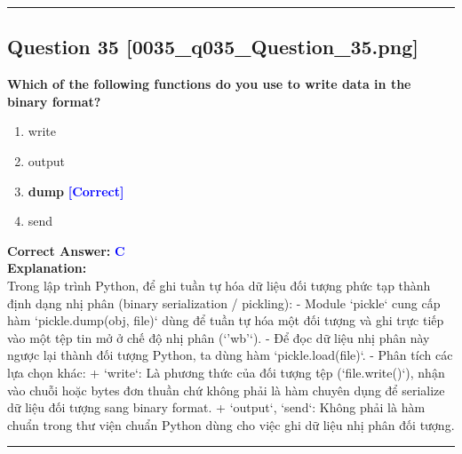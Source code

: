 \documentclass[11pt,a4paper]{article}
\begin{document}
\vspace{0.8cm}
\hrule
\vspace{0.5cm}

\begin{minipage}{\textwidth}
\subsection*{Question 35 \quad \footnotesize{[0035_q035_Question_35.png]}}
\noindent \textbf{Which of the following functions do you use to write data in the binary format?}

\begin{enumerate}[label=\Alph*.]
    \item write
    \item output
    \item \textbf{dump} \hfill \textcolor{blue}{\textbf{[Correct]}}
    \item send
\end{enumerate}

\noindent \textbf{Correct Answer:} \textcolor{blue}{\textbf{C}} \\[4pt]
\noindent \textbf{Explanation:}\\
Trong lập trình Python, để ghi tuần tự hóa dữ liệu đối tượng phức tạp thành định dạng nhị phân (binary serialization / pickling):\newline
- Module `pickle` cung cấp hàm `pickle.dump(obj, file)` dùng để tuần tự hóa một đối tượng và ghi trực tiếp vào một tệp tin mở ở chế độ nhị phân (`'wb'`).\newline
- Để đọc dữ liệu nhị phân này ngược lại thành đối tượng Python, ta dùng hàm `pickle.load(file)`.\newline
- Phân tích các lựa chọn khác:\newline
  + `write`: Là phương thức của đối tượng tệp (`file.write()`), nhận vào chuỗi hoặc bytes đơn thuần chứ không phải là hàm chuyên dụng để serialize dữ liệu đối tượng sang binary format.\newline
  + `output`, `send`: Không phải là hàm chuẩn trong thư viện chuẩn Python dùng cho việc ghi dữ liệu nhị phân đối tượng.
\end{minipage}
\vspace{0.8cm}
\hrule
\vspace{0.5cm}
\end{document}
